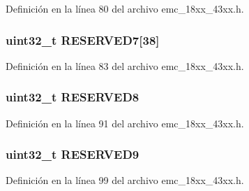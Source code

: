 Definición en la línea 80 del archivo emc\+\_\+18xx\+\_\+43xx.\+h.

\subsubsection[{\texorpdfstring{R\+E\+S\+E\+R\+V\+E\+D7}{RESERVED7}}]{ uint32\+\_\+t R\+E\+S\+E\+R\+V\+E\+D7\mbox{[}38\mbox{]}}\hypertarget{struct_l_p_c___e_m_c___t_aea93988f6285190a7a90a24f678c9bcd}{}\label{struct_l_p_c___e_m_c___t_aea93988f6285190a7a90a24f678c9bcd}


Definición en la línea 83 del archivo emc\+\_\+18xx\+\_\+43xx.\+h.

\subsubsection[{\texorpdfstring{R\+E\+S\+E\+R\+V\+E\+D8}{RESERVED8}}]{ uint32\+\_\+t R\+E\+S\+E\+R\+V\+E\+D8}\hypertarget{struct_l_p_c___e_m_c___t_a8f95ffb34e6309c5b738e2d843a034b1}{}\label{struct_l_p_c___e_m_c___t_a8f95ffb34e6309c5b738e2d843a034b1}


Definición en la línea 91 del archivo emc\+\_\+18xx\+\_\+43xx.\+h.

\subsubsection[{\texorpdfstring{R\+E\+S\+E\+R\+V\+E\+D9}{RESERVED9}}]{ uint32\+\_\+t R\+E\+S\+E\+R\+V\+E\+D9}\hypertarget{struct_l_p_c___e_m_c___t_a035d74ba63de1d3be3fe9507b863f6a5}{}\label{struct_l_p_c___e_m_c___t_a035d74ba63de1d3be3fe9507b863f6a5}


Definición en la línea 99 del archivo emc\+\_\+18xx\+\_\+43xx.\+h.


